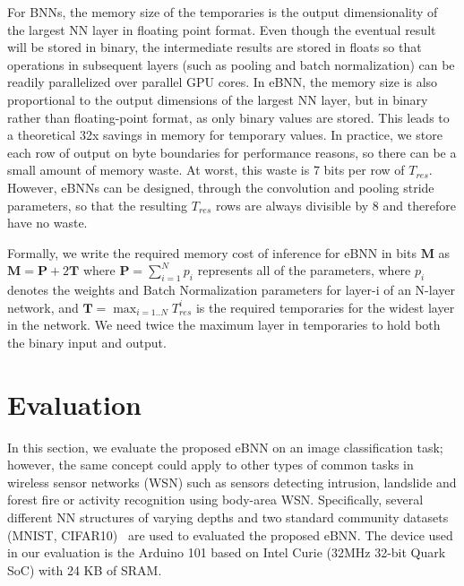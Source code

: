 \documentclass[10pt,emptycopyrightspace]{ewsn-proc}
\newenvironment{review}{\par\color{redncs}}{\par}
\begin{document}
For BNNs, the memory size of the temporaries is the output dimensionality of the largest NN layer in floating point format. Even though the eventual result will be stored in binary, the intermediate results are stored in floats so that operations in subsequent layers (such as pooling and batch normalization) can be readily parallelized over parallel GPU cores. In eBNN, the memory size is also proportional to the output dimensions of the largest NN layer, but in binary rather than floating-point format, as only binary values are stored. This leads to a theoretical 32x savings in memory for temporary values. In practice, we store each row of output on byte boundaries for performance reasons, so there can be a small amount of memory waste. At worst, this waste is 7 bits per row of $T_{res}$. However, eBNNs can be designed, through the convolution and pooling stride parameters, so that the resulting $T_{res}$ rows are always divisible by $8$ and therefore have no waste.

Formally, we write the required memory cost of inference for eBNN in bits $\textbf{M}$ as $\textbf{M} = \textbf{P} + 2\textbf{T}$ where $\textbf{P} = \sum_{i=1}^N p_i$ represents all of the parameters, where $p_i$ denotes the weights and Batch Normalization parameters for layer-i of an N-layer network, and $\textbf{T} = \max_{i=1..N} T_{res}^i$ is the required temporaries for the widest layer in the network. We need twice the maximum layer in temporaries to hold both the binary input and output.


\section{Evaluation}
\label{sec:eval}
In this section, we evaluate the proposed eBNN on an image classification task; however, the same concept could apply to other types of common tasks in wireless sensor networks (WSN) such as sensors detecting intrusion, landslide and forest fire or activity recognition using body-area WSN. Specifically, several different NN structures of varying depths and two standard community datasets (MNIST, CIFAR10)~\cite{lecun1998mnist,krizhevsky2009learning} are used to evaluated the proposed eBNN. The device used in our evaluation is the Arduino 101 based on Intel Curie (32MHz 32-bit Quark SoC) with 24 KB of SRAM.
\end{document}

